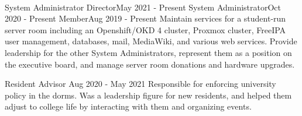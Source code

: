 \vspace{1.5pt} %


\cvtag{\LaTeX}
\medskip
\\

\vspace{6pt} %

    {System Administrator Director}{May 2021 - Present}
    {System Administrator}{Oct 2020 - Present}
    {Member}{Aug 2019 - Present}
    {Maintain services for a student-run server room including an Openshift/OKD 4 cluster, Proxmox cluster, FreeIPA user management, databases, mail, MediaWiki, and various web services. Provide leadership for the other System Administrators, represent them as a position on the executive board, and manage server room donations and hardware upgrades.}

    {Resident Advisor} {Aug 2020 - May 2021}
    {Responsible for enforcing university policy in the dorms. Was a leadership figure for new residents, and helped them adjust to college life by interacting with them and organizing events.}